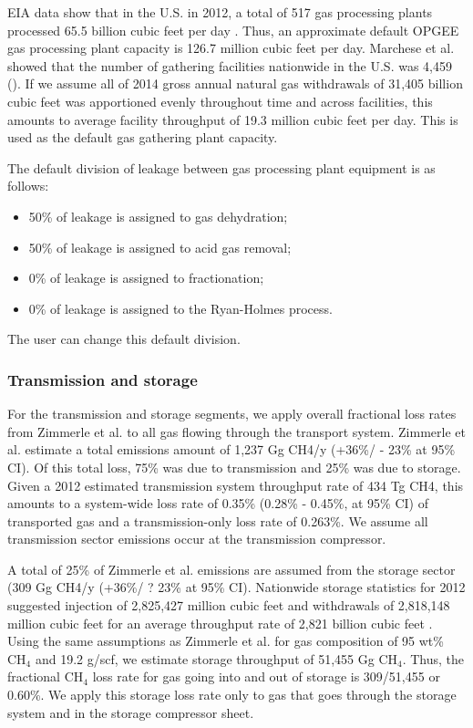\documentclass[11pt]{report}
\begin{document}
EIA data show that in the U.S. in 2012, a total of 517 gas processing plants processed 65.5 billion cubic feet per day \cite{EIA2012}. Thus, an approximate default OPGEE gas processing plant capacity is 126.7 million cubic feet per day. Marchese et al. \cite{Marchese2015} showed that the number of gathering facilities nationwide in the U.S. was 4,459 (\cite[SI Table S12]{Marchese2015}). If we assume all of 2014 gross annual natural gas withdrawals of 31,405 billion cubic feet \cite{EIA2020gas} was apportioned evenly throughout time and across facilities, this amounts to average facility throughput of 19.3 million cubic feet per day. This is used as the default gas gathering plant capacity.

The default division of leakage between gas processing plant equipment is as follows:
\begin{itemize}
\item	50\% of leakage is assigned to gas dehydration;
\item	50\% of leakage is assigned to acid gas removal;
\item	0\% of leakage is assigned to fractionation;
\item	0\% of leakage is assigned to the Ryan-Holmes process.
\end{itemize}
The user can change this default division.

\subsubsection{Transmission and storage}
For the transmission and storage segments, we apply overall fractional loss rates from Zimmerle et al. \cite{Zimmerle2015} to all gas flowing through the transport system. Zimmerle et al. estimate a total emissions amount of 1,237 Gg CH4/y (+36\%/ - 23\% at 95\% CI). Of this total loss, 75\% was due to transmission and 25\% was due to storage. Given a 2012 estimated transmission system throughput rate of 434 Tg CH4, this amounts to a system-wide loss rate of 0.35\% (0.28\% - 0.45\%, at 95\% CI) of transported gas and a transmission-only loss rate of 0.263\%. We assume all transmission sector emissions occur at the transmission compressor.

A total of 25\% of Zimmerle et al. \cite{Zimmerle2015} emissions are assumed from the storage sector (309 Gg CH4/y (+36\%/ ? 23\% at 95\% CI). Nationwide storage statistics for 2012 suggested injection of 2,825,427 million cubic feet and withdrawals of 2,818,148 million cubic feet for an average throughput rate of 2,821 billion cubic feet \cite{EIA2012NGAnnual}. Using the same assumptions as Zimmerle et al. for gas composition of 95 wt\% CH$_4$ and 19.2 g/scf, we estimate storage throughput of 51,455 Gg CH$_4$. Thus, the fractional CH$_4$ loss rate for gas going into and out of storage is 309/51,455 or 0.60\%. We apply this storage loss rate only to gas that goes through the storage system and in the storage compressor sheet.
\end{document}
